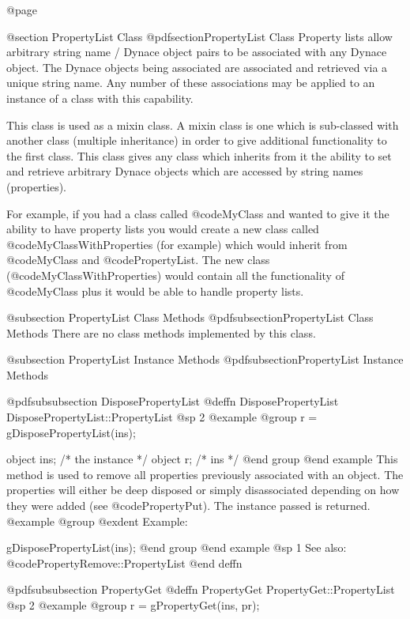 @page

@section PropertyList Class
@pdfsection{PropertyList Class}
Property lists allow arbitrary string name / Dynace object pairs to
be associated with any Dynace object.  The Dynace objects being associated
are associated and retrieved via a unique string name.  Any number of these
associations may be applied to an instance of a class with this capability.

This class is used as a mixin class.  A mixin class is one which is
sub-classed with another class (multiple inheritance) in order to give
additional functionality to the first class.  This class gives any class
which inherits from it the ability to set and retrieve arbitrary Dynace
objects which are accessed by string names (properties).

For example, if you had a class called @code{MyClass} and wanted to give it
the ability to have property lists you would create a new class called
@code{MyClassWithProperties} (for example) which would inherit from
@code{MyClass} and @code{PropertyList}.  The new class (@code{MyClassWithProperties})
would contain all the functionality of @code{MyClass} plus it would be able
to handle property lists.


@subsection PropertyList Class Methods
@pdfsubsection{PropertyList Class Methods}
There are no class methods implemented by this class.


@subsection PropertyList Instance Methods
@pdfsubsection{PropertyList Instance Methods}










@pdfsubsubsection {DisposePropertyList}
@deffn {DisposePropertyList} DisposePropertyList::PropertyList
@sp 2
@example
@group
r = gDisposePropertyList(ins);

object  ins;   /*  the instance */
object  r;     /*  ins  */
@end group
@end example
This method is used to remove all properties previously associated with an
object.  The properties will either be deep disposed or simply disassociated
depending on how they were added (see @code{PropertyPut}).  The instance
passed is returned.
@example
@group
@exdent Example:

gDisposePropertyList(ins); 
@end group
@end example
@sp 1
See also:  @code{PropertyRemove::PropertyList}
@end deffn





@pdfsubsubsection {PropertyGet}
@deffn {PropertyGet} PropertyGet::PropertyList
@sp 2
@example
@group
r = gPropertyGet(ins, pr);

